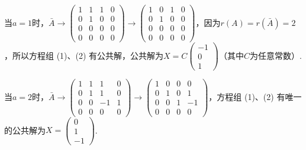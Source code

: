 \begin{exercise}
\begin{exgroup}
\begin{answer}
        当$a=1$时，$\bar{A}\rightarrow\begin{pmatrix}
                1 & 1 & 1 & 0 \\
                0 & 1 & 0 & 0 \\
                0 & 0 & 0 & 0 \\
                0 & 0 & 0 & 0
            \end{pmatrix}\rightarrow\begin{pmatrix}
                1 & 0 & 1 & 0 \\
                0 & 1 & 0 & 0 \\
                0 & 0 & 0 & 0 \\
                0 & 0 & 0 & 0
            \end{pmatrix}$，因为$r(A)=r(\bar{A})=2$，所以方程组 (1)、(2) 有公共解，公共解为$X=C\begin{pmatrix} -1 \\ 0  \\ 1 \end{pmatrix}$（其中$C$为任意常数）.

        当$a=2$时，$\bar{A}\rightarrow\begin{pmatrix}
                1 & 1 & 1  & 0 \\
                0 & 1 & 1  & 0 \\
                0 & 0 & -1 & 1 \\
                0 & 0 & 0  & 0
            \end{pmatrix}\rightarrow\begin{pmatrix}
                1 & 0 & 0 & 0  \\
                0 & 1 & 0 & 1  \\
                0 & 0 & 1 & -1 \\
                0 & 0 & 0 & 0
            \end{pmatrix}$，方程组 (1)、(2) 有唯一的公共解为$X=\begin{pmatrix}
                0 \\
                1 \\
                -1
            \end{pmatrix}$.
        \end{answer}
    \end{exgroup}


\end{exercise}
